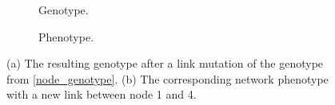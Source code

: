 \begin{figure}[htb]
    \begin{mdframed}
        \begin{subfigure}[b]{0.45\textwidth}
            \centering
            \resizebox{1\textwidth}{!}{}
            \caption{Genotype.}
            \label{link_genotype}
        \end{subfigure}
        \begin{subfigure}[b]{0.45\textwidth}
            \centering
            \resizebox{0.65\textwidth}{!}{}
            \caption{Phenotype.}
            \label{link_phenotype}
        \end{subfigure}
    \end{mdframed}
    \caption{ (a) The resulting genotype after a link mutation of the genotype from \ref{node_genotype}. (b) The
    corresponding network phenotype with a new link between node 1 and 4.}
    \label{link_mutation}
\end{figure}
